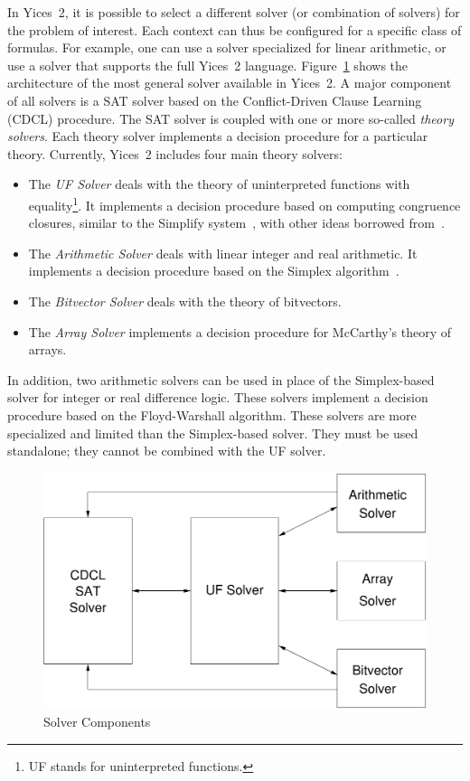 \documentclass[11pt,twoside,fleqn,openright,titlepage]{cslreport}
\begin{document}
In Yices~2, it is possible to select a different solver (or
combination of solvers) for the problem of interest. Each context can
thus be configured for a specific class of formulas. For example, one
can use a solver specialized for linear arithmetic, or use a solver
that supports the full Yices~2
language. Figure~\ref{solver-architecture} shows the architecture of
the most general solver available in Yices~2. A major component of all
solvers is a SAT solver based on the Conflict-Driven Clause Learning
(CDCL) procedure. The SAT solver is coupled with one or more so-called
\emph{theory solvers}. Each theory solver implements a decision
procedure for a particular theory.  Currently, Yices~2 includes four
main theory solvers:
\begin{itemize}
\item The \emph{UF Solver} deals with the theory of uninterpreted
  functions with equality\footnote{UF stands for uninterpreted
    functions.}. It implements a decision procedure based on computing
  congruence closures, similar to the Simplify
  system~\cite{Detlefs-etal:JACM2005}, with other ideas borrowed
  from~\cite{Nieuwenhuis+Oliveras:UF:2007}.
\item The \emph{Arithmetic Solver} deals with linear integer and real
  arithmetic.  It implements a decision procedure based on the Simplex
  algorithm~\cite{DutertredeMoura:cav06,DutertredeMoura:report06}.
\item The \emph{Bitvector Solver} deals with the theory of bitvectors.
\item  The \emph{Array  Solver}  implements a  decision procedure  for
  McCarthy's theory of arrays.
\end{itemize}
In addition, two arithmetic solvers can be used in place of the
Simplex-based solver for integer or real difference logic. These
solvers implement a decision procedure based on the Floyd-Warshall
algorithm. These solvers are more specialized and limited than the
Simplex-based solver. They must be used standalone; they cannot be
combined with the UF solver.

\begin{figure}
\includegraphics[width=12cm]{yices2-architecture}
\caption{Solver Components}
\label{solver-architecture}
\end{figure}
\end{document}
